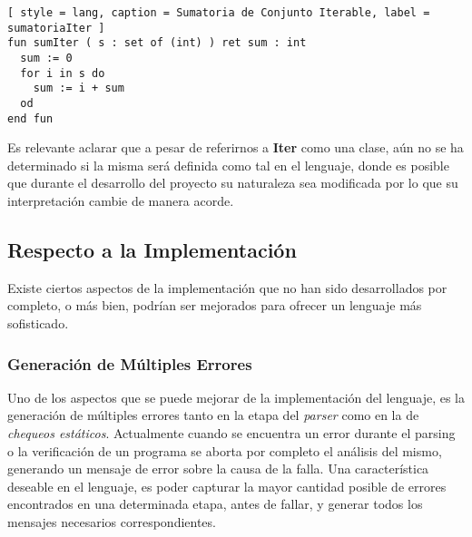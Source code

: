 \begin{lstlisting}[ style = lang, caption = Sumatoria de Conjunto Iterable, label = sumatoriaIter ]
fun sumIter ( s : set of (int) ) ret sum : int
  sum := 0
  for i in s do
    sum := i + sum
  od
end fun
\end{lstlisting}

Es relevante aclarar que a pesar de referirnos a \textbf{Iter} como una clase, aún no se ha determinado si la misma será definida como tal en el lenguaje, donde es posible que durante el desarrollo del proyecto su naturaleza sea modificada por lo que su interpretación cambie de manera acorde.

\subsection{Respecto a la Implementación}

Existe ciertos aspectos de la implementación que no han sido desarrollados por completo, o más bien, podrían ser mejorados para ofrecer un lenguaje más sofisticado.

\subsubsection{Generación de Múltiples Errores}

Uno de los aspectos que se puede mejorar de la implementación del lenguaje, es la generación de múltiples errores tanto en la etapa del \textit{parser} como en la de \textit{chequeos estáticos}.
Actualmente cuando se encuentra un error durante el parsing o la verificación de un programa se aborta por completo el análisis del mismo, generando un mensaje de error sobre la causa de la falla.
Una característica deseable en el lenguaje, es poder capturar la mayor cantidad posible de errores encontrados en una determinada etapa, antes de fallar, y generar todos los mensajes necesarios correspondientes.

